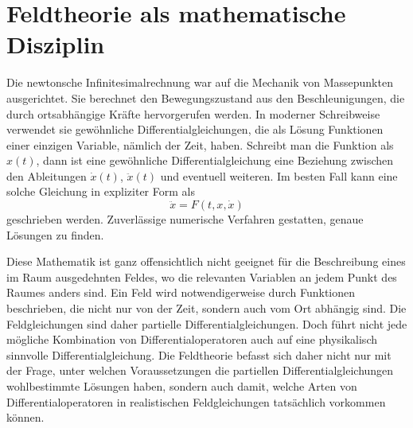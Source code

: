 %
%
%
\section{Feldtheorie als mathematische Disziplin}
Die newtonsche Infinitesimalrechnung war auf die Mechanik von Massepunkten
ausgerichtet.
Sie berechnet den Bewegungszustand aus den Beschleunigungen, die durch
ortsabhängige Kräfte hervorgerufen werden.
In moderner Schreibweise verwendet sie gewöhnliche Differentialgleichungen,
die als Lösung Funktionen einer einzigen Variable, nämlich der Zeit, haben.
Schreibt man die Funktion als $x(t)$, dann ist eine
gewöhnliche Differentialgleichung eine Beziehung zwischen den 
Ableitungen $\dot{x}(t)$, $\ddot{x}(t)$ und eventuell weiteren.
Im besten Fall kann eine solche Gleichung in expliziter Form als
\[
\ddot{x} = F(t, x, \dot{x})
\]
geschrieben werden.
Zuverlässige numerische Verfahren gestatten, genaue Lösungen zu finden.

Diese Mathematik ist ganz offensichtlich nicht geeignet für die
Beschreibung eines im Raum ausgedehnten Feldes, wo die relevanten
Variablen an jedem Punkt des Raumes anders sind.
Ein Feld wird notwendigerweise durch Funktionen beschrieben, die nicht
nur von der Zeit, sondern auch vom Ort abhängig sind.
Die Feldgleichungen sind daher partielle Differentialgleichungen.
%
%
Doch führt nicht jede mögliche Kombination von Differentialoperatoren
auch auf eine physikalisch sinnvolle Differentialgleichung.
Die Feldtheorie befasst sich daher nicht nur mit der Frage, unter
welchen Voraussetzungen die partiellen Differentialgleichungen
wohlbestimmte Lösungen haben, sondern auch damit, welche Arten von
Differentialoperatoren in realistischen Feldgleichungen tatsächlich
vorkommen können.

